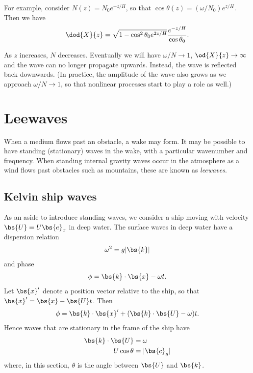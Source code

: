 For example, consider $N(z) = N_0 e^{-z/H}$, so that $\cos\theta(z) =
(\omega/N_0) e^{z/H}$. Then we have 
\begin{equation}
    \dod{X}{z} = \sqrt{1 - \cos^2 \theta_0 e^{2z/H}} \frac{e^{-z/H}}{\cos\theta_0}.
\end{equation}

As $z$ increases, $N$ decreases. Eventually we will have $\omega/N \rightarrow
1$, $\od{X}{z} \rightarrow \infty$ and the wave can no longer propagate upwards.
Instead, the wave is reflected back downwards. (In practice, the amplitude of
the wave also grows as we approach $\omega/N\rightarrow1$, so that nonlinear
processes start to play a role as well.)

\section{Leewaves}

When a medium flows past an obstacle, a wake may form. It may be possible to
have standing (stationary) waves in the wake, with a particular wavenumber and
frequency.  When standing internal gravity waves occur in the atmosphere as a
wind flows past obstacles such as mountains, these are known as
\textit{leewaves}.

\subsection{Kelvin ship waves}

As an aside to introduce standing waves, we consider a ship moving with velocity
$\bs{U} = U\bs{e}_x$ in deep water. The surface waves in deep water have a
dispersion relation
\begin{equation}
\omega^2 = g|\bs{k}|
\end{equation}
and phase
\begin{equation}
	\phi = \bs{k}\cdot\bs{x} - \omega t.
\end{equation}
Let $\bs{x}'$ denote a position vector relative to the ship, so that $\bs{x}' =
\bs{x} - \bs{U}t$. Then
\begin{equation}
	\phi = \bs{k}\cdot\bs{x}' + (\bs{k}\cdot\bs{U} - \omega) t.
\end{equation}
Hence waves that are stationary in the frame of the ship have
\begin{align}
	\bs{k}\cdot\bs{U} &= \omega \\
	U\cos\theta &= |\bs{c}_g|
\end{align}
where, in this section, $\theta$ is the angle between $\bs{U}$ and $\bs{k}$. 

